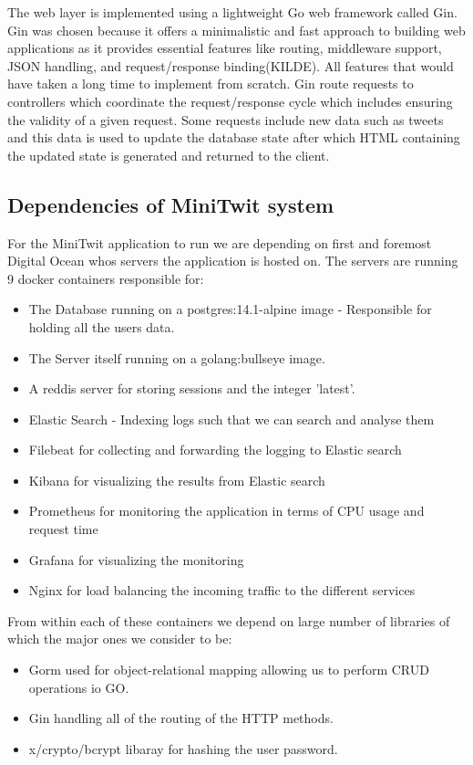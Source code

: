 The web layer is implemented using a lightweight Go web framework called Gin. 
Gin was chosen because it offers a minimalistic and fast approach to building web applications as it provides 
essential features like routing, middleware support, JSON handling, and request/response binding(KILDE). 
All features that would have taken a long time to implement from scratch. Gin route requests to controllers 
which coordinate the request/response cycle which includes ensuring the validity of a given request. 
Some requests include new data such as tweets and this data is used to update the database state after 
which HTML containing the updated state is generated and returned to the client. \\


\subsection{Dependencies of MiniTwit system}

For the MiniTwit application to run we are depending on first and foremost Digital Ocean whos servers the application is 
hosted on. The servers are running 9 docker containers responsible for: 
\begin{itemize}
    \item The Database running on a postgres:14.1-alpine image - Responsible for holding all the users data.
    \item The Server itself running on a golang:bullseye image.
    \item A reddis server for storing sessions and the integer 'latest'.
    \item Elastic Search - Indexing logs such that we can search and analyse them
    \item Filebeat for collecting and forwarding the logging to Elastic search
    \item Kibana for visualizing the results from Elastic search
    \item Prometheus for monitoring the application in terms of CPU usage and request time
    \item Grafana for visualizing the monitoring
    \item Nginx for load balancing the incoming traffic to the different services
\end{itemize}

From within each of these containers we depend on large number of libraries of which the major ones we consider to be:
\begin{itemize}
    \item Gorm used for object-relational mapping allowing us to perform CRUD operations io GO.
    \item Gin handling all of the routing of the HTTP methods.
    \item x/crypto/bcrypt libaray for hashing the user password.
\end{itemize}

